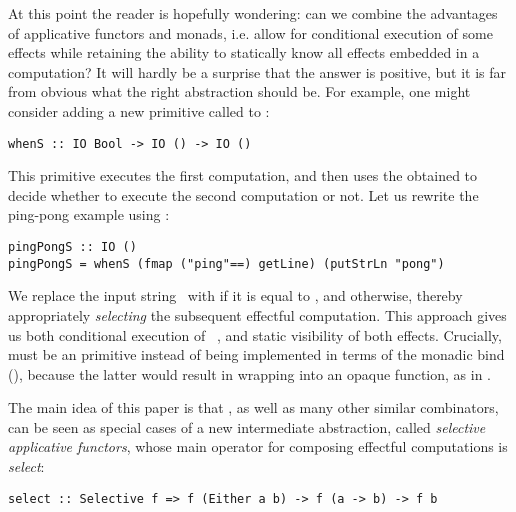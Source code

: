 At this point the reader is hopefully wondering: can we combine the advantages
of applicative functors and monads, i.e. allow for conditional execution of some
effects while retaining the ability to statically know all effects embedded in
a computation? It will hardly be a surprise that the answer is positive, but it
is far from obvious what the right abstraction should be. For example, one might
consider adding a new primitive called  to :

\vspace{0.5mm}
\begin{verbatim}
whenS :: IO Bool -> IO () -> IO ()
\end{verbatim}
\vspace{0.5mm}

\noindent
This primitive executes the first computation, and then uses the obtained
 to decide whether to execute the second computation or not. Let us
rewrite the ping-pong example using :

\vspace{0.5mm}
\begin{verbatim}
pingPongS :: IO ()
pingPongS = whenS (fmap ("ping"==) getLine) (putStrLn "pong")
\end{verbatim}
\vspace{0.5mm}

\noindent
We replace the input string~ with  if it is equal to ,
and  otherwise, thereby appropriately \emph{selecting} the subsequent
effectful computation. This approach gives us both conditional execution of
~, and static visibility of both effects. Crucially,
 must be an  primitive instead of being implemented in terms of
the monadic bind (\hs{>>=}), because the latter would result in wrapping
 into an opaque function, as in .

The main idea of this paper is that , as well as many other similar
combinators, can be seen as special cases of a new intermediate abstraction,
called \emph{selective applicative functors}, whose main operator for composing
effectful computations is \emph{select}:

\vspace{0.5mm}
\begin{verbatim}
select :: Selective f => f (Either a b) -> f (a -> b) -> f b
\end{verbatim}
\vspace{0.5mm}

